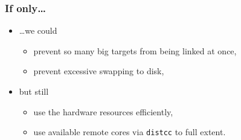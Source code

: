 \documentclass[compress,table,xcolor=table]{beamer}
\newcommand{\shelltext}[1]{\texttt{\colorbox{light-gray}{#1}}}
\begin{document}
\begin{frame}
    \frametitle{If only\ldots}
  \begin{itemize}
    \LARGE
    \item \ldots we could
    \begin{itemize}
      \Large
      \item prevent so many big targets from being linked at once,
      \item prevent excessive swapping to disk,
    \end{itemize}
    \item but still
    \begin{itemize}
      \Large
      \item use the hardware resources efficiently,
	  \item use available remote cores via \shelltext{distcc} to full extent.
    \end{itemize}
  \end{itemize}
\end{frame}
\end{document}
